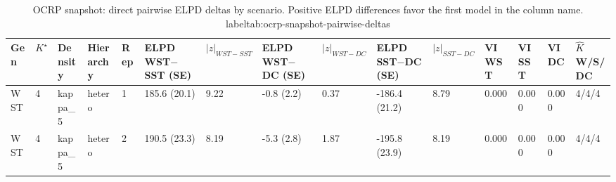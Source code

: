 \begin{table}[!h]
\centering
\caption{OCRP snapshot: direct pairwise ELPD deltas by scenario. Positive ELPD differences favor the first model in the column name.\\label{tab:ocrp-snapshot-pairwise-deltas}}
\centering
\begin{tabular}[t]{lllllllllllllll}
\toprule
Gen & $K^\star$ & Density & Hierarchy & Rep & ELPD WST$-$SST (SE) & $|z|_{WST-SST}$ & ELPD WST$-$DC (SE) & $|z|_{WST-DC}$ & ELPD SST$-$DC (SE) & $|z|_{SST-DC}$ & VI WST & VI SST & VI DC & $\hat K$ W/S/DC\\
\midrule
WST & 4 & kappa_5 & hetero & 1 & 185.6 (20.1) & 9.22 & -0.8 (2.2) & 0.37 & -186.4 (21.2) & 8.79 & 0.000 & 0.000 & 0.000 & 4/4/4\\
WST & 4 & kappa_5 & hetero & 2 & 190.5 (23.3) & 8.19 & -5.3 (2.8) & 1.87 & -195.8 (23.9) & 8.19 & 0.000 & 0.000 & 0.000 & 4/4/4\\
\bottomrule
\end{tabular}
\end{table}
